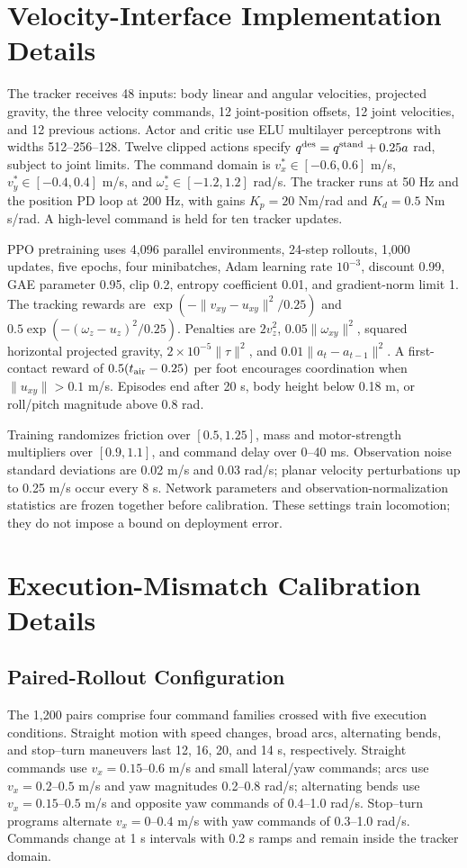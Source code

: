 \documentclass[conference]{IEEEtran}
\begin{document}
\section{Velocity-Interface Implementation Details}
\label{app:velocity_interface}
The tracker receives 48 inputs: body linear and angular velocities, projected
gravity, the three velocity commands, 12 joint-position offsets, 12 joint
velocities, and 12 previous actions. Actor and critic use ELU multilayer
perceptrons with widths 512--256--128. Twelve clipped actions specify
$q^{\rm des}=q^{\rm stand}+0.25a$ rad, subject to joint limits.
The command domain is $v_x^*\in[-0.6,0.6]$ m/s,
$v_y^*\in[-0.4,0.4]$ m/s, and $\omega_z^*\in[-1.2,1.2]$ rad/s.
The tracker runs at 50 Hz and the position PD loop at 200 Hz, with gains
$K_p=20$ Nm/rad and $K_d=0.5$ Nm\,s/rad. A high-level command is held for
ten tracker updates.

PPO pretraining uses 4,096 parallel environments, 24-step rollouts, 1,000
updates, five epochs, four minibatches, Adam learning rate $10^{-3}$,
discount 0.99, GAE parameter 0.95, clip 0.2, entropy coefficient 0.01,
and gradient-norm limit 1. The tracking rewards are
$\exp(-\|v_{xy}-u_{xy}\|^2/0.25)$ and
$0.5\exp(-(\omega_z-u_z)^2/0.25)$. Penalties are
$2v_z^2$, $0.05\|\omega_{xy}\|^2$, squared horizontal projected gravity,
$2{\times}10^{-5}\|\tau\|^2$, and $0.01\|a_t-a_{t-1}\|^2$.
A first-contact reward of $0.5(t_{\rm air}-0.25)$ per foot encourages
coordination when $\|u_{xy}\|>0.1$ m/s. Episodes end after 20 s, body height
below 0.18 m, or roll/pitch magnitude above 0.8 rad.

Training randomizes friction over $[0.5,1.25]$, mass and motor-strength
multipliers over $[0.9,1.1]$, and command delay over 0--40 ms. Observation
noise standard deviations are 0.02 m/s and 0.03 rad/s; planar velocity
perturbations up to 0.25 m/s occur every 8 s. Network parameters and
observation-normalization statistics are frozen together before calibration.
These settings train locomotion; they do not impose a bound on deployment error.

\section{Execution-Mismatch Calibration Details}
\label{app:calibration_details}
\subsection{Paired-Rollout Configuration}
The 1,200 pairs comprise four command families crossed with five execution
conditions. Straight motion with speed changes, broad arcs, alternating bends,
and stop--turn maneuvers last 12, 16, 20, and 14 s, respectively.
Straight commands use $v_x=0.15$--$0.6$ m/s and small lateral/yaw commands;
arcs use $v_x=0.2$--$0.5$ m/s and yaw magnitudes 0.2--0.8 rad/s;
alternating bends use $v_x=0.15$--$0.5$ m/s and opposite yaw commands of
0.4--1.0 rad/s. Stop--turn programs alternate $v_x=0$--$0.4$ m/s with
yaw commands of 0.3--1.0 rad/s. Commands change at 1 s intervals with
0.2 s ramps and remain inside the tracker domain.
\end{document}
